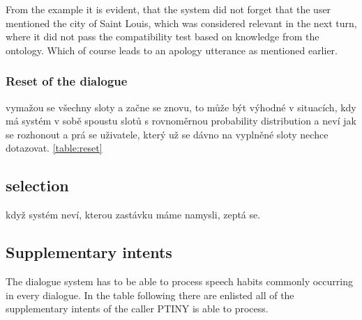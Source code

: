 From the example it is evident, that the system did not forget that the user mentioned the city of Saint Louis, which was considered relevant in the next turn, where it did not pass the compatibility test based on knowledge from the ontology.
Which of course leads to an apology utterance as mentioned earlier.



\subsubsection{Reset of the dialogue}

vymažou se všechny sloty a začne se znovu, to může být výhodné v situacích, kdy má systém v sobě spoustu slotů s rovnoměrnou probability distribution a neví jak se rozhonout a prá se uživatele, který už se dávno na vyplněné sloty nechce dotazovat.
\ref{table:reset}

\subsection{selection}

když systém neví, kterou zastávku máme namysli, zeptá se.




\subsection{Supplementary intents} %

The dialogue system has to be able to process speech habits commonly occurring in every dialogue.
In the table following there are enlisted all of the supplementary intents of the caller PTINY is able to process.

